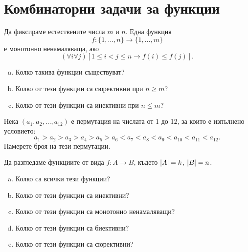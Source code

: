 \section{Комбинаторни задачи за функции}

\begin{problem}
  Да фиксираме естествените числа $m$ и $n$.
  Една функция \[f:\{1,\dots,n\}\to\{1,\dots,m\}\] е монотонно ненамаляваща, ако
  \[(\forall i\forall j)[1\leq i<j\leq n \rightarrow f(i)\leq f(j)].\]
  \begin{enumerate}[a)]
  \item
    Колко такива функции съществуват?
  \item
    Колко от тези функции са сюрективни при $n\geq m$?
  \item
    Колко от тези функции са инективни при $n\leq m$?
\end{enumerate}
\end{problem}


\begin{problem}
  Нека $(a_1,a_2,\dots,a_{12})$ е пермутация на числата от 1 до 12, за които е изпълнено условието:
  \[a_1 > a_2 > a_3 > a_4 > a_5 > a_6 < a_7 < a_8 < a_9 < a_{10} < a_{11} < a_{12}.\]
  Намерете броя на тези пермутации.  
\end{problem}

\begin{problem}
  Да разгледаме функциите от вида $f:A\to B$,
  където $\lvert{A}\rvert = k$, $\lvert{B}\rvert = n$.
  \begin{enumerate}[a)]
  \item 
    Колко са всички тези функции?
  \item
    Колко от тези функции са инективни?
  \item
    Колко от тези функции са монотонно ненамаляващи?
  \item
    Колко от тези функции са биективни?
  \item
    Колко от тези функции са сюрективни?
  \end{enumerate}
\end{problem}

